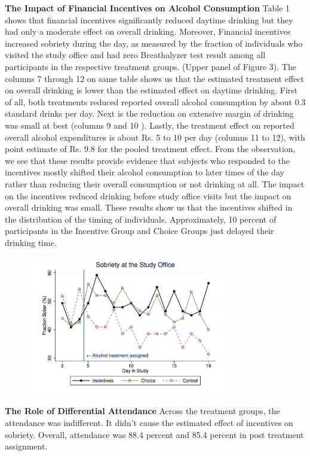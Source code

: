 \documentclass[a4paper,12pt]{article}
\begin{document}
\textbf{The Impact of Financial Incentives on Alcohol Consumption}
Table 1 shows that financial incentives significantly reduced daytime drinking but they had only a moderate effect on overall drinking. Moreover, Financial incentives increased sobriety during the day, as measured by the fraction of individuals who visited the study office and had zero Breathalyzer test result among all participants in the respective treatment groups. (Upper panel of Figure 3). The columns 7 through 12 on same table shows us that the estimated treatment effect on overall drinking is lower than the estimated effect on daytime drinking. First of all, both treatments reduced reported overall alcohol consumption by about 0.3 standard drinks per day. Next is the reduction on extensive margin of drinking was small at best (columns 9 and 10 ). Lastly, the treatment effect on reported overall alcohol expenditures is about Rs. 5 to 10 per day (columns 11 to 12), with point estimate of Rs. 9.8 for the pooled treatment effect. From the observation, we see that these results provide evidence that subjects who responded to the incentives mostly shifted their alcohol consumption to later times of the day rather than reducing their overall consumption or not drinking at all. The impact on the incentives reduced drinking before study office visits but the impact on overall drinking was small. These results show us that the incentives shifted in the distribution of the timing of individuals. Approximately, 10 percent of participants in the Incentive Group and Choice Groups just delayed their drinking time. 
\begin{figure}[h]
\centering
\includegraphics[width=0.8\textwidth]{Figure3.png}
\caption{\label{fig:Figure3}}
\end{figure}

\textbf{The Role of Differential Attendance}
Across the treatment groups, the attendance was indifferent. It didn't cause the estimated effect of incentives on sobriety. Overall, attendance was 88.4 percent and 85.4 percent in post treatment assignment. 
\end{document}
